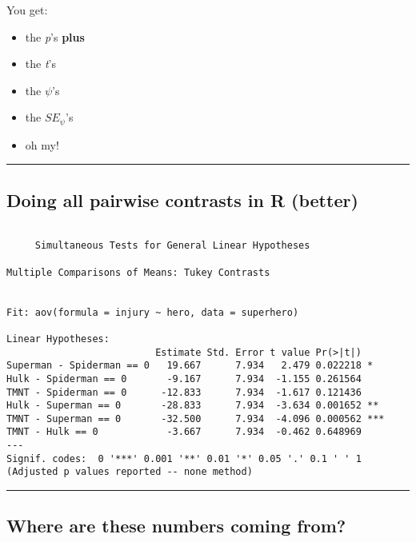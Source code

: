\documentclass[]{article}
\providecommand{\tightlist}{%
  \setlength{\itemsep}{0pt}\setlength{\parskip}{0pt}}
\begin{document}
You get:

\begin{itemize}
\tightlist
\item
  the \emph{p}'s \textbf{plus}
\item
  the \emph{t}'s
\item
  the \(\psi\)'s
\item
  the \(SE_{\psi}\)'s
\item
  oh my!
\end{itemize}

\begin{center}\rule{0.5\linewidth}{\linethickness}\end{center}

\hypertarget{doing-all-pairwise-contrasts-in-r-better-1}{%
\subsection{Doing all pairwise contrasts in R
(better)}\label{doing-all-pairwise-contrasts-in-r-better-1}}

\begin{verbatim}

     Simultaneous Tests for General Linear Hypotheses

Multiple Comparisons of Means: Tukey Contrasts


Fit: aov(formula = injury ~ hero, data = superhero)

Linear Hypotheses:
                          Estimate Std. Error t value Pr(>|t|)    
Superman - Spiderman == 0   19.667      7.934   2.479 0.022218 *  
Hulk - Spiderman == 0       -9.167      7.934  -1.155 0.261564    
TMNT - Spiderman == 0      -12.833      7.934  -1.617 0.121436    
Hulk - Superman == 0       -28.833      7.934  -3.634 0.001652 ** 
TMNT - Superman == 0       -32.500      7.934  -4.096 0.000562 ***
TMNT - Hulk == 0            -3.667      7.934  -0.462 0.648969    
---
Signif. codes:  0 '***' 0.001 '**' 0.01 '*' 0.05 '.' 0.1 ' ' 1
(Adjusted p values reported -- none method)
\end{verbatim}

\begin{center}\rule{0.5\linewidth}{\linethickness}\end{center}

\hypertarget{where-are-these-numbers-coming-from}{%
\subsection{Where are these numbers coming
from?}\label{where-are-these-numbers-coming-from}}
\end{document}
